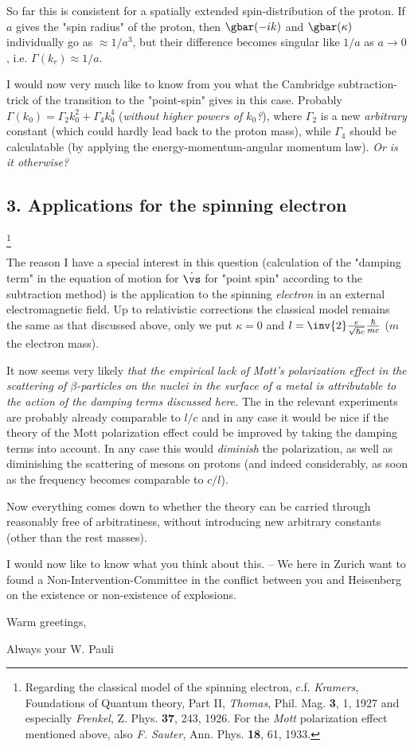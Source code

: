 So far this is consistent for a spatially extended spin-distribution of the proton. If $a$ gives the "spin radius" of the proton, then $\gbar(-ik)$ and $\gbar(\kappa)$ individually go as $\approx 1/a^3$, but their difference becomes singular like $1/a$ as $a \to 0$, i.e. $\Gamma(k_r) \approx 1/a$.

I would now very much like to know from you what the Cambridge subtraction-trick of the transition to the "point-spin" gives in this case. Probably $\Gamma(k_0) = \Gamma_2 k_0^2 + \Gamma_4 k_0^4$ (\textit{without higher powers of $k_0$?}), where $\Gamma_2$ is a new \textit{arbitrary} constant (which could hardly lead back to the proton mass), while $\Gamma_4$ should be calculatable (by applying the energy-momentum-angular momentum law). \textit{Or is it otherwise?}

\subsection*{3. Applications for the spinning electron}\footnote{Regarding the classical model of the spinning electron, c.f. \textit{Kramers}, Foundations of Quantum theory, Part II, \textit{Thomas}, Phil. Mag. \textbf{3}, 1, 1927 and especially \textit{Frenkel}, Z. Phys. \textbf{37}, 243, 1926. For the \textit{Mott} polarization effect mentioned above, also \textit{F. Sauter}, Ann. Phys. \textbf{18}, 61, 1933.}

The reason I have a special interest in this question (calculation of the "damping term" in the equation of motion for $\dot{\vs}$ for "point spin" according to the subtraction method) is the application to the spinning \textit{electron} in an external electromagnetic field. Up to relativistic corrections the classical model remains the same as that discussed above, only we put $\kappa=0$ and $l=\inv{2}\frac{e}{\sqrt{\hbar c}}\frac{\hbar}{mc}$ ($m$ the electron mass).

It now seems very likely \textit{that the empirical lack of Mott's polarization effect in the scattering of $\beta$-particles on the nuclei in the surface of a metal is attributable to the action of the damping terms discussed here.} The  in the relevant experiments are probably already comparable to $l/c$ and in any case it would be nice if the theory of the Mott polarization effect could be improved by taking the damping terms into account. In any case this would \textit{diminish} the polarization, as well as diminishing the scattering of mesons on protons (and indeed considerably, as soon as the frequency becomes comparable to $c/l$).

Now everything comes down to whether the theory can be carried through reasonably free of arbitratiness, without introducing new arbitrary constants (other than the rest masses).

I would now like to know what you think about this. -- We here in Zurich want to found a Non-Intervention-Committee in the conflict between you and Heisenberg on the existence or non-existence of explosions.

Warm greetings,

Always your W. Pauli


